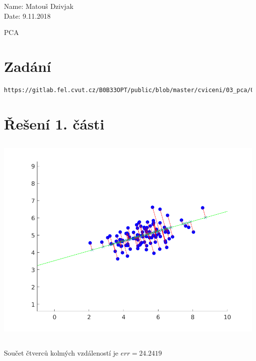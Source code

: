 \documentclass[10pt,a4paper,openright]{article}
\begin{document}
	\begin{flushleft}
		\large Name: Matouš Dzivjak\\
		\large Date: 9.11.2018\\
	\end{flushleft}
\begin{center}
	\huge PCA
\end{center}
\section{Zadání}
\begin{verbatim}
https://gitlab.fel.cvut.cz/B0B33OPT/public/blob/master/cviceni/03_pca/03_pca.pdf
\end{verbatim}


\section{Řešení 1. části}
\subsection{}
\includegraphics[scale=0.8]{line.png}

\subsection{}
\begin{center}
Součet čtverců kolmých vzdáleností je $err = 24.2419$
\end{center}

\subsection{}
\end{document}
